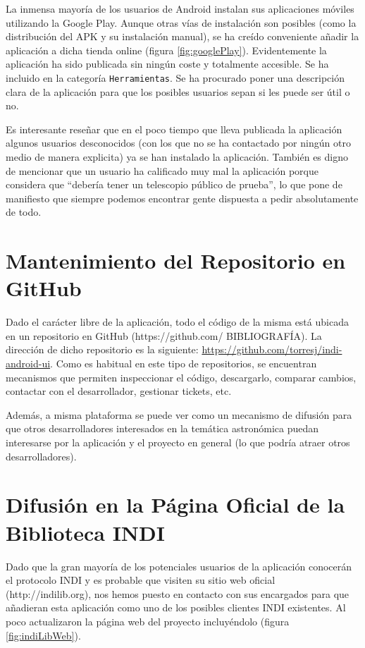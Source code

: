 La inmensa mayoría de los usuarios de Android instalan sus aplicaciones móviles utilizando la Google Play. Aunque otras vías de instalación son posibles (como la distribución del APK y su instalación manual), se ha creído conveniente añadir la aplicación a dicha tienda online (figura \ref{fig:googlePlay}). Evidentemente la aplicación ha sido publicada sin ningún coste y totalmente accesible. Se ha incluido en la categoría \texttt{Herramientas}. Se ha procurado poner una descripción clara de la aplicación para que los posibles usuarios sepan si les puede ser útil o no.

Es interesante reseñar que en el poco tiempo que lleva publicada la aplicación algunos usuarios desconocidos (con los que no se ha contactado por ningún otro medio de manera explicita) ya se han instalado la aplicación. También es digno de mencionar que un usuario ha calificado muy mal la aplicación porque considera que ``debería tener un telescopio público de prueba'', lo que pone de manifiesto que siempre podemos encontrar gente dispuesta a pedir absolutamente de todo.

\section{Mantenimiento del Repositorio en GitHub}

Dado el carácter libre de la aplicación, todo el código de la misma está ubicada en un repositorio en GitHub (https://github.com/ BIBLIOGRAFÍA). La dirección de dicho repositorio es la siguiente: \href{https://github.com/torresj/indi-android-ui}{https://github.com/torresj/indi-android-ui}. Como es habitual en este tipo de repositorios, se encuentran mecanismos que permiten inspeccionar el código, descargarlo, comparar cambios, contactar con el desarrollador, gestionar tickets, etc.

Además, a misma plataforma se puede ver como un mecanismo de difusión para que otros desarrolladores interesados en la temática astronómica puedan interesarse por la aplicación y el proyecto en general (lo que podría atraer otros desarrolladores).

\section{Difusión en la Página Oficial de la Biblioteca INDI}

Dado que la gran mayoría de los potenciales usuarios de la aplicación conocerán el protocolo INDI y es probable que visiten su sitio web oficial (http://indilib.org), nos hemos puesto en contacto con sus encargados para que añadieran esta aplicación como uno de los posibles clientes INDI existentes. Al poco actualizaron la página web del proyecto incluyéndolo (figura \ref{fig:indiLibWeb}).


